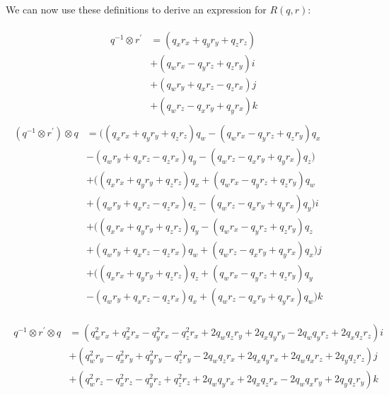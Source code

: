 \documentclass{article}
\begin{document}
We can now use these definitions to derive an expression for $R(q, r)$:

\begin{align}
    \begin{split}
        q^{-1} \otimes r^\prime &= (q_xr_x + q_yr_y + q_zr_z) \\
                                &+ (q_wr_x - q_yr_z + q_zr_y)i \\
                                &+ (q_wr_y + q_xr_z - q_zr_x)j \\
                                &+ (q_wr_z - q_xr_y + q_yr_x)k
    \end{split}
\end{align}
\begin{align}
    \begin{split}
        (q^{-1} \otimes r^\prime) \otimes q &= ((q_xr_x + q_yr_y + q_zr_z)q_w - (q_wr_x - q_yr_z + q_zr_y)q_x \\
                                            &- (q_wr_y + q_xr_z - q_zr_x)q_y - (q_wr_z - q_xr_y + q_yr_x)q_z) \\
                                            &+ ((q_xr_x + q_yr_y + q_zr_z)q_x + (q_wr_x - q_yr_z + q_zr_y)q_w \\
                                            &+ (q_wr_y + q_xr_z - q_zr_x)q_z - (q_wr_z - q_xr_y + q_yr_x)q_y)i \\
                                            &+ ((q_xr_x + q_yr_y + q_zr_z)q_y - (q_wr_x - q_yr_z + q_zr_y)q_z \\
                                            &+ (q_wr_y + q_xr_z - q_zr_x)q_w + (q_wr_z - q_xr_y + q_yr_x)q_x)j \\
                                            &+ ((q_xr_x + q_yr_y + q_zr_z)q_z + (q_wr_x - q_yr_z + q_zr_y)q_y \\
                                            &- (q_wr_y + q_xr_z - q_zr_x)q_x + (q_wr_z - q_xr_y + q_yr_x)q_w)k \\
    \end{split} \nonumber \\
    \nonumber \\
    \begin{split}
        q^{-1} \otimes r^\prime \otimes q &= (q_w^2r_x + q_x^2r_x - q_y^2r_x - q_z^2r_x + 2q_wq_zr_y + 2q_xq_yr_y - 2q_wq_yr_z + 2q_xq_zr_z)i \\
                                          &+ (q_w^2r_y - q_x^2r_y + q_y^2r_y - q_z^2r_y - 2q_wq_zr_x + 2q_xq_yr_x + 2q_wq_xr_z + 2q_yq_zr_z)j \\
                                          &+ (q_w^2r_z - q_x^2r_z - q_y^2r_z + q_z^2r_z + 2q_wq_yr_x + 2q_xq_zr_x - 2q_wq_xr_y + 2q_yq_zr_y)k
    \end{split}
\end{align}
\end{document}
